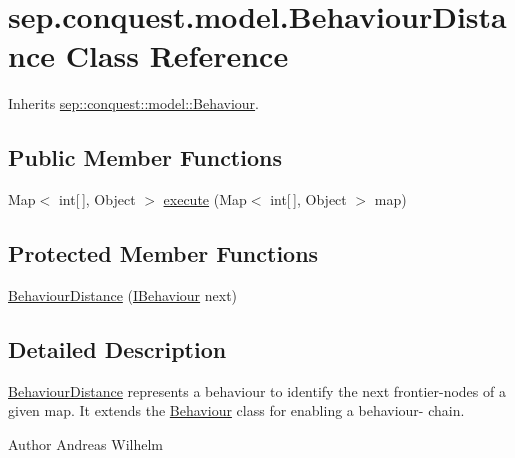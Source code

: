\hypertarget{classsep_1_1conquest_1_1model_1_1_behaviour_distance}{
\section{sep.conquest.model.BehaviourDistance Class Reference}
\label{classsep_1_1conquest_1_1model_1_1_behaviour_distance}
}


Inherits \hyperlink{classsep_1_1conquest_1_1model_1_1_behaviour}{sep::conquest::model::Behaviour}.

\subsection*{Public Member Functions}
\begin{DoxyCompactItemize}
\item 
Map$<$ int\mbox{[}$\,$\mbox{]}, Object $>$ \hyperlink{classsep_1_1conquest_1_1model_1_1_behaviour_distance_a351d79be7ec3599134f3a15bc39fbc2e}{execute} (Map$<$ int\mbox{[}$\,$\mbox{]}, Object $>$ map)
\end{DoxyCompactItemize}
\subsection*{Protected Member Functions}
\begin{DoxyCompactItemize}
\item 
\hyperlink{classsep_1_1conquest_1_1model_1_1_behaviour_distance_afe04453c23a0b1aa2dea24ec116d89a2}{BehaviourDistance} (\hyperlink{interfacesep_1_1conquest_1_1model_1_1_i_behaviour}{IBehaviour} next)
\end{DoxyCompactItemize}


\subsection{Detailed Description}
\hyperlink{classsep_1_1conquest_1_1model_1_1_behaviour_distance}{BehaviourDistance} represents a behaviour to identify the next frontier-\/nodes of a given map. It extends the \hyperlink{classsep_1_1conquest_1_1model_1_1_behaviour}{Behaviour} class for enabling a behaviour-\/ chain.

\begin{DoxyAuthor}{Author}
Andreas Wilhelm 
\end{DoxyAuthor}


